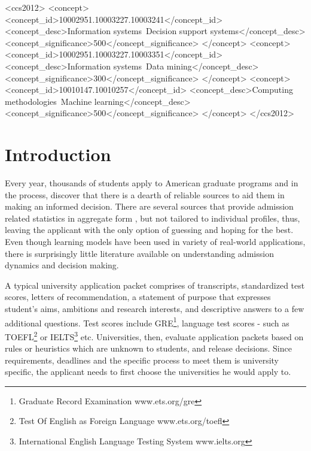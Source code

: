 \documentclass{sig-alternate-05-2015}
\begin{document}
%
%
\begin{CCSXML}
<ccs2012>
<concept>
<concept_id>10002951.10003227.10003241</concept_id>
<concept_desc>Information systems~Decision support systems</concept_desc>
<concept_significance>500</concept_significance>
</concept>
<concept>
<concept_id>10002951.10003227.10003351</concept_id>
<concept_desc>Information systems~Data mining</concept_desc>
<concept_significance>300</concept_significance>
</concept>
<concept>
<concept_id>10010147.10010257</concept_id>
<concept_desc>Computing methodologies~Machine learning</concept_desc>
<concept_significance>500</concept_significance>
</concept>
</ccs2012>
\end{CCSXML}


%
%

%
%
\printccsdesc



\section{Introduction}
\label{sec:intro}
Every year, thousands of students apply to American graduate programs and in the process, discover that there is a dearth of reliable sources to aid them in making an informed decision. There are several sources that provide admission related statistics in aggregate form \cite{usnews, qs}, but not tailored to individual profiles, thus, leaving the applicant with the only option of guessing and hoping for the best. Even though learning models have been used in variety of real-world applications, there is surprisingly little literature available on understanding admission dynamics and decision making.

A typical university application packet comprises of transcripts, standardized test scores, letters of recommendation, a statement of purpose that expresses student’s aims, ambitions and research interests, and descriptive answers to a few additional questions. Test scores include GRE\footnote{Graduate Record Examination \tiny{www.ets.org/gre}}, language test scores - such as TOEFL\footnote{Test Of English as Foreign Language \tiny{www.ets.org/toefl}} or IELTS\footnote{International English Language Testing System \tiny{www.ielts.org}} etc. Universities, then, evaluate application packets based on rules or heuristics which are unknown to students, and release decisions. Since requirements, deadlines and the specific process to meet them is university specific, the applicant needs to first choose the universities he would apply to.
\end{document}
